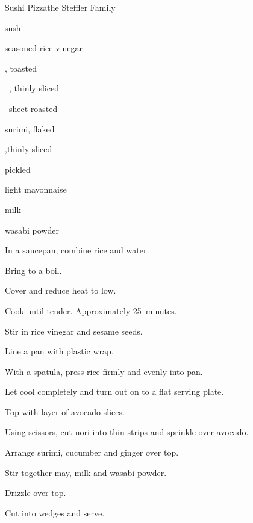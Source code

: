 \begin{recipe}{Sushi Pizza}{the Steffler Family}{}

\begin{ingredients}
\item {} sushi 
\item \C{\quarter} seasoned rice vinegar
\item {} , toasted
\item \half~, thinly sliced
\item \half~sheet roasted 
\item \C{\threequarter} surimi, flaked
\item \C{\half} ,thinly sliced
\item {} pickled 
\item {} light mayonnaise
\item {} milk
\item {} wasabi powder
\end{ingredients}

\begin{directions}
\item In a saucepan, combine rice and \C{1\quarter} water.
\item Bring to a boil.
\item Cover and reduce heat to low.
\item Cook until tender. Approximately 25~minutes.
\item Stir in rice vinegar and sesame seeds.
\item Line a pan with plastic wrap.
\item With a spatula, press rice firmly and evenly into pan.
\item Let cool completely and turn out on to a flat serving plate.
\item Top with layer of avocado slices.
\item Using scissors, cut nori into thin strips and sprinkle over avocado.
\item Arrange surimi, cucumber and ginger over top.
\item Stir together may, milk and wasabi powder.
\item Drizzle over top.
\item Cut into wedges and serve.
\end{directions}
\end{recipe}
